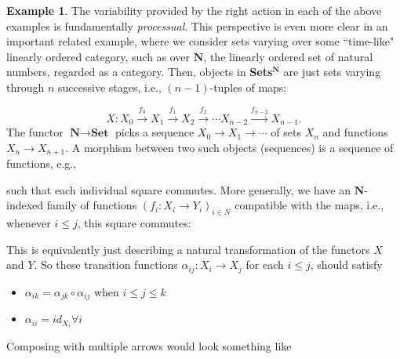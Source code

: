 \documentclass[a4paper]{book}
\theoremstyle{definition}
\newtheorem{example}{Example}[section]
\theoremstyle{definition}
\theoremstyle{definition}
\theoremstyle{theorem}
\theoremstyle{definition}
\begin{document}
\begin{example}
		The variability provided by the right action in each of the above examples is fundamentally \textit{processual}. This perspective is even more clear in an important related example, where we consider sets varying over some ``time-like" linearly ordered category, such as over $\textbf{N}$, the linearly ordered set of natural numbers, regarded as a category. Then, objects in \textbf{Sets$^{\textbf{N}}$} are just sets varying through $n$ successive stages, i.e., $(n-1)$-tuples of maps: \par
		\begin{equation*}
		X: 	X_0 \xrightarrow{f_0} X_1 \xrightarrow{f_1} X_2 \xrightarrow{f_2} \cdots X_{n-2} \xrightarrow{f_{n-2}} X_{n-1}.  
		\end{equation*} 
		The functor $\textbf{N} \rightarrow \textbf{Set}$ picks a sequence $X_0 \rightarrow X_1 \rightarrow \cdots$ of sets $X_n$ and functions $X_n \rightarrow X_{n+1}$. A morphism between two such objects (sequences) is a sequence of functions, e.g., 
		\begin{center} 
		\end{center} 
		such that each individual square commutes. More generally, we have an $\textbf{N}$-indexed family of functions $(f_i: X_i \rightarrow Y_i)_{i \in N}$ compatible with the maps, i.e., whenever $i \leq j$, this square commutes: 
		\begin{center}  
		\end{center}  
		This is equivalently just describing a natural transformation of the functors $X$ and $Y$. So these transition functions $\alpha_{ij}: X_i \rightarrow X_j$ for each $i \leq j$, should satisfy
		\begin{itemize}
			\item $\alpha_{ik} = \alpha_{jk} \circ \alpha_{ij}$ when $i\leq j \leq k$
			\item $\alpha_{ii} = id_{X_i} \forall i$
		\end{itemize}
		Composing with multiple arrows would look something like 
		\begin{center} 

\end{center}
\end{example}
\end{document}

